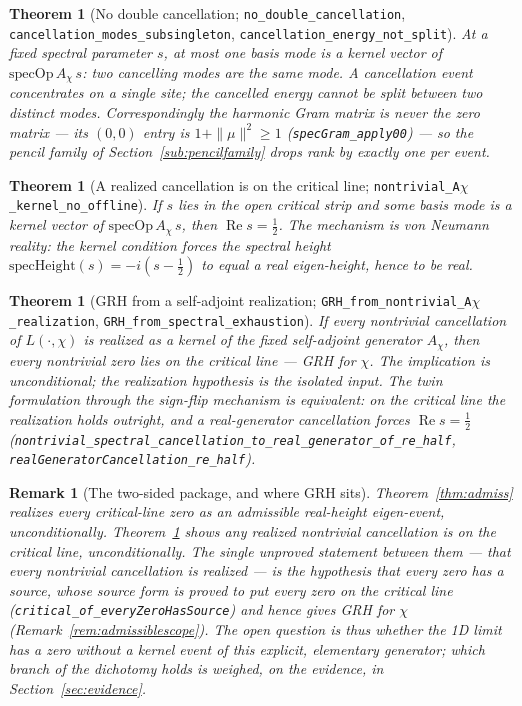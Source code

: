 \documentclass[11pt]{article}
\newtheorem{theorem}[definition]{Theorem}
\newtheorem{remark}[definition]{Remark}
\DeclareMathOperator{\Ree}{Re}
\newcommand{\code}[1]{\texttt{#1}}
\begin{document}
\begin{theorem}[No double cancellation; \code{no\_double\_cancellation}, \code{cancellation\_modes\_subsingleton}, \code{cancellation\_energy\_not\_split}]\label{thm:nodouble}
At a fixed spectral parameter $s$, at most one basis mode is a kernel vector of
$\mathrm{specOp}\,A_\chi\,s$: two cancelling modes are the same mode.  A cancellation event
concentrates on a single site; the cancelled energy cannot be split between two distinct modes.
Correspondingly the harmonic Gram matrix is never the zero matrix --- its $(0,0)$ entry is
$1+\|\mu\|^2\ge1$ (\code{specGram\_apply00}) --- so the pencil family of
Section~\ref{sub:pencilfamily} drops rank by exactly one per event.
\end{theorem}

\begin{theorem}[A realized cancellation is on the critical line; \code{nontrivial\_A$\chi$\_kernel\_no\_offline}]\label{thm:kernelonline}
If $s$ lies in the open critical strip and some basis mode is a kernel vector of
$\mathrm{specOp}\,A_\chi\,s$, then $\Ree s=\tfrac12$.  The mechanism is von Neumann reality: the
kernel condition forces the spectral height $\mathrm{specHeight}(s)=-i(s-\tfrac12)$ to equal a real
eigen-height, hence to be real.
\end{theorem}

\begin{theorem}[GRH from a self-adjoint realization; \code{GRH\_from\_nontrivial\_A$\chi$\_realization}, \code{GRH\_from\_spectral\_exhaustion}]\label{thm:grhreal}
If every nontrivial cancellation of $L(\cdot,\chi)$ is realized as a kernel of the fixed
self-adjoint generator $A_\chi$, then every nontrivial zero lies on the critical line --- GRH for
$\chi$.  The implication is unconditional; the realization hypothesis is the isolated
input.  The twin formulation through the sign-flip mechanism is equivalent: on the critical line the
realization holds outright, and a real-generator cancellation forces $\Ree s=\tfrac12$
(\code{nontrivial\_spectral\_cancellation\_to\_real\_generator\_of\_re\_half},
\code{realGeneratorCancellation\_re\_half}).
\end{theorem}

\begin{remark}[The two-sided package, and where GRH sits]\label{rem:sandwich}
Theorem~\ref{thm:admiss} realizes every \emph{critical-line} zero as an admissible real-height
eigen-event, unconditionally.  Theorem~\ref{thm:kernelonline} shows any \emph{realized} nontrivial
cancellation is on the critical line, unconditionally.  The single unproved statement between them
--- that every nontrivial cancellation \emph{is} realized --- is the hypothesis that \emph{every
zero has a source}, whose source form is proved to put every zero on the critical line
(\code{critical\_of\_everyZeroHasSource}) and hence gives GRH for $\chi$
(Remark~\ref{rem:admissiblescope}).  The open question is thus whether the 1D limit has a zero
without a kernel event of this explicit, elementary generator; which branch of the dichotomy
holds is weighed, on the evidence, in Section~\ref{sec:evidence}.
\end{remark}
\end{document}
